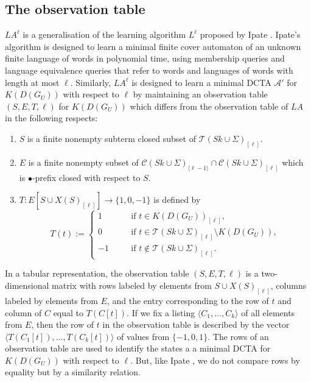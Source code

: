 \documentclass[preprint,12pt,english]{article}
\def\cA{\mathcal{A}}
\def\cC{\mathcal{C}}
\def\cT{\mathcal{T}}
\newcommand\pair[1]{\langle{#1}\rangle}
\begin{document}
\subsection{The observation table}
$LA^\ell$ is a generalisation of the learning algorithm $L^\ell$ proposed by Ipate \cite{Ipate:2012}. Ipate's algorithm is designed to learn a minimal finite cover automaton of an unknown finite language of words in polynomial time, using membership queries and language equivalence queries that refer to words and languages of words with  length at most $\ell$. Similarly,  $LA^\ell$ is designed to learn a minimal DCTA $\cA'$ for $K(D(G_U))$ with respect to $\ell$ by maintaining an observation table $(S,E,T,\ell)$ for $K(D(G_U))$ which differs from the observation table of $LA$ in the following respects:
\begin{enumerate}
\item $S$ is a finite nonempty subterm closed subset of $\cT(Sk\cup\Sigma)_{[\ell]}$. 
\item  $E$ is a finite nonempty  subset of $\cC(Sk\cup\Sigma)_{\pair{\ell-1}}\cap \cC(Sk\cup\Sigma)_{[\ell]}$ which is $\bullet$-prefix closed with respect to $S$.
\item $T:E[S\cup X(S)_{[\ell]}]\to\{1,0,-1\}$ is defined by 
$$T(t):=\left\{\begin{array}{rcl}
1&\quad&\text{if }t\in K(D(G_U))_{[\ell]},\\
0&&\text{if }t\in \cT(Sk\cup\Sigma)_{[\ell]}\setminus K(D(G_U)),\\
-1&&\text{if }t\not\in \cT(Sk\cup\Sigma)_{[\ell ]}.
\end{array}\right.$$
\end{enumerate}
In a tabular representation, the observation table $(S,E,T,\ell)$ is a two-dimensional matrix with rows labeled by elements from $S\cup X(S)_{[\ell]}$, columns labeled by elements from $E$, and the entry corresponding to the row of $t$ and column of $C$ equal to $T(C[t]).$
If we fix a listing $\pair{C_1,\ldots,C_k}$ of all elements from $E$, then the row of $t$ in the observation table is described by the vector $\pair{T(C_1[t]),\ldots,T(C_k[t])}$ of values from $\{-1, 0, 1\}.$ The rows of an observation table are used to identify the states a a minimal DCTA for $K(D(G_U))$ with respect to $\ell$. But, like Ipate \cite{Ipate:2012}, we do not compare rows by equality but by a similarity relation. 
\end{document}
